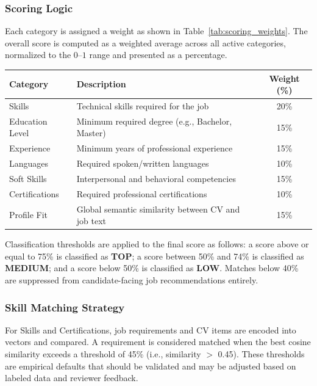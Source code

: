 \subsubsection{Scoring Logic}

Each category is assigned a weight as shown in Table~\ref{tab:scoring_weights}. The overall score is computed as a weighted average across all active categories, normalized to the $0$--$1$ range and presented as a percentage.

\begin{center}
\label{tab:scoring_weights}
\renewcommand{\arraystretch}{1.2}
\begin{tabularx}{\textwidth}{|l|X|c|}
\hline
\rowcolor{gray!20} \textbf{Category} & \textbf{Description} & \textbf{Weight (\%)} \\
\hline
Skills & Technical skills required for the job & 20\% \\
\hline
Education Level & Minimum required degree (e.g., Bachelor, Master) & 15\% \\
\hline
Experience & Minimum years of professional experience & 15\% \\
\hline
Languages & Required spoken/written languages & 10\% \\
\hline
Soft Skills & Interpersonal and behavioral competencies & 15\% \\
\hline
Certifications & Required professional certifications & 10\% \\
\hline
Profile Fit & Global semantic similarity between CV and job text & 15\% \\
\hline
\end{tabularx}
\end{center}

Classification thresholds are applied to the final score as follows: a score above or equal to 75\% is classified as \textbf{TOP}; a score between 50\% and 74\% is classified as \textbf{MEDIUM}; and a score below 50\% is classified as \textbf{LOW}. Matches below 40\% are suppressed from candidate-facing job recommendations entirely.

\subsubsection{Skill Matching Strategy}

For Skills and Certifications, job requirements and CV items are encoded into vectors and compared. A requirement is considered matched when the best cosine similarity exceeds a threshold of 45\% (i.e., similarity $>$ 0.45). These thresholds are empirical defaults that should be validated and may be adjusted based on labeled data and reviewer feedback.

